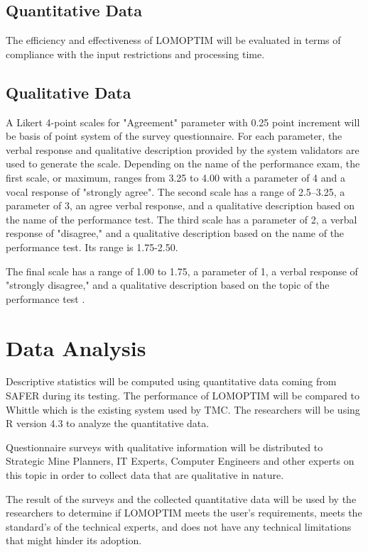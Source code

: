 \documentclass[12pt]{report}
\begin{document}
\subsection{Quantitative Data}

The efficiency and effectiveness of LOMOPTIM will be evaluated in terms of compliance with the input restrictions and processing time.

\subsection{Qualitative Data}

A Likert 4-point scales for "Agreement" parameter with 0.25 point increment will be basis of point system of the survey questionnaire.
For each parameter, the verbal response and qualitative description provided by the system validators are used to generate the scale.
Depending on the name of the performance exam, the first scale, or maximum, ranges from 3.25 to 4.00 with a parameter of 4 and a vocal response of "strongly agree".
The second scale has a range of 2.5–3.25, a parameter of 3, an agree verbal response, and a qualitative description based on the name of the performance test.
The third scale has a parameter of 2, a verbal response of "disagree," and a qualitative description based on the name of the performance test.
Its range is 1.75-2.50.

The final scale has a range of 1.00 to 1.75, a parameter of 1, a verbal response of "strongly disagree," and a qualitative description based on the topic of the performance test \cite{Likert}.

\section{Data Analysis}

Descriptive statistics will be computed using quantitative data coming from SAFER during its testing.
The performance of LOMOPTIM will be compared to Whittle which is the existing system used by TMC.
The researchers will be using R version 4.3 \cite{R} to analyze the quantitative data.

Questionnaire surveys with qualitative information will be distributed to Strategic Mine Planners, IT Experts, Computer Engineers and other experts on this topic in order to collect data that are qualitative in nature.

The result of the surveys and the collected quantitative data will be used by the researchers to determine if LOMOPTIM meets the user's requirements, meets the standard's of the technical experts, and does not have any technical limitations that might hinder its adoption.
\end{document}
